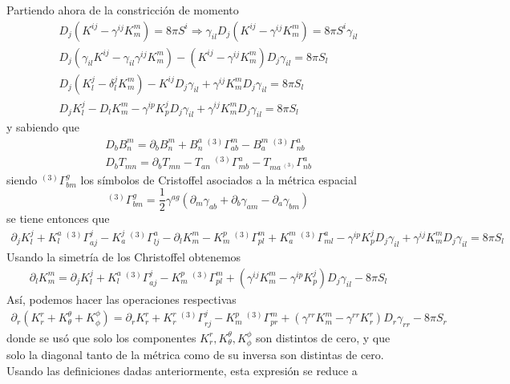 \documentclass[11pt,twoside,openright,spanish]{report}
\numberwithin{equation}{chapter}
\numberwithin{figure}{chapter}
\numberwithin{table}{chapter}
\begin{document}
Partiendo ahora de la constricción de momento
\begin{align*}
D_j\left(K^{ij}-\gamma^{ij}K^m_m\right)=8\pi S^i\Rightarrow \gamma_{il}D_j\left(K^{ij}-\gamma^{ij}K^m_m\right)=8\pi S^i\gamma_{il}\\
D_j\left(\gamma_{il}K^{ij}-\gamma_{il}\gamma^{ij}K^m_m\right)-\left(K^{ij}-\gamma^{ij}K^m_m\right)D_j\gamma_{il}=8\pi S_l\\
D_j\left(K^j_l-\delta^j_l K_m^m\right)-K^{ij}D_j\gamma_{il}+\gamma^{ij}K_m^m D_j\gamma_{il}=8\pi S_l\\
D_jK^j_l-D_l K_m^m-\gamma^{ip}K^j_p D_j\gamma_{il}+\gamma^{ij}K_m^m D_j\gamma_{il}=8\pi S_l
\end{align*}
y sabiendo que 
\begin{align*}
D_b B^m_n=\partial_b B^m_n+B^a_n\ ^{(3)}\Gamma^m_{ab}-B^m_a\ ^{(3)}\Gamma^a_{nb}\\
D_b T_{mn}=\partial_b T_{mn}-T_{an}\ ^{(3)}\Gamma^a_{mb}-T_{ma\ ^{(3)}}\Gamma^a_{nb}
\end{align*}
siendo $^{(3)}\Gamma^g_{bm}$ los símbolos de Cristoffel asociados a la métrica espacial
\begin{equation*}
^{(3)}\Gamma^g_{bm}=\frac{1}{2}\gamma^{ag}\left(\partial_m \gamma_{ab}+\partial_b \gamma_{am}-\partial_a \gamma_{bm}\right)
\end{equation*}
se tiene entonces que
\begin{align*}
\partial_j K^j_l + K^a_l\ ^{(3)}\Gamma^j_{aj}-K^j_a\ ^{(3)}\Gamma^a_{lj}-\partial_l K^m_m- K^p_m\ ^{(3)}\Gamma^m_{pl}+K^m_a\ ^{(3)}\Gamma^a_{ml}-\gamma^{ip}K^j_p D_j\gamma_{il}+\gamma^{ij}K_m^m D_j\gamma_{il}=8\pi S_l
\end{align*}
Usando la simetría de los Christoffel obtenemos 
\begin{align*}
\partial_l K^m_m=\partial_j K^j_l + K^a_l\ ^{(3)}\Gamma^j_{aj}- K^p_m\ ^{(3)}\Gamma^m_{pl}+\left(\gamma^{ij}K_m^m -\gamma^{ip}K^j_p\right)D_j\gamma_{il}-8\pi S_l
\end{align*}
Así, podemos hacer las operaciones respectivas
\begin{align*}
\partial_r (K^r_r+K_\theta^\theta+K_\phi^\phi)=\partial_r K^r_r + K^r_r\ ^{(3)}\Gamma^j_{rj}- K^p_m\ ^{(3)}\Gamma^m_{pr}+\left(\gamma^{rr}K_m^m -\gamma^{rr}K^r_r\right)D_r\gamma_{rr}-8\pi S_r
\end{align*}
donde se usó que solo los componentes $K_r^r, K^\theta_\theta, K_\phi^\phi$ son distintos de cero, y que solo la diagonal tanto de la métrica como de su inversa son distintas de cero. Usando las definiciones dadas anteriormente, esta expresión se reduce a
\end{document}
